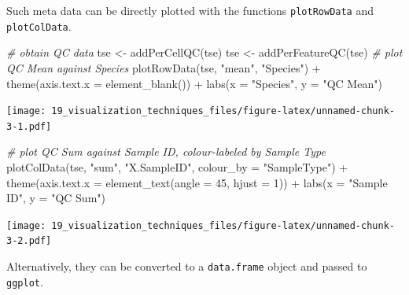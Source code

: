 \documentclass[
]{book}
\newenvironment{Shaded}{\begin{snugshade}}{\end{snugshade}}
\newcommand{\AttributeTok}[1]{\textcolor[rgb]{0.77,0.63,0.00}{#1}}
\newcommand{\CommentTok}[1]{\textcolor[rgb]{0.56,0.35,0.01}{\textit{#1}}}
\newcommand{\DecValTok}[1]{\textcolor[rgb]{0.00,0.00,0.81}{#1}}
\newcommand{\FunctionTok}[1]{\textcolor[rgb]{0.00,0.00,0.00}{#1}}
\newcommand{\NormalTok}[1]{#1}
\newcommand{\OtherTok}[1]{\textcolor[rgb]{0.56,0.35,0.01}{#1}}
\newcommand{\SpecialCharTok}[1]{\textcolor[rgb]{0.00,0.00,0.00}{#1}}
\newcommand{\StringTok}[1]{\textcolor[rgb]{0.31,0.60,0.02}{#1}}
\begin{document}
Such meta data can be directly plotted with the functions
\texttt{plotRowData} and \texttt{plotColData}.

\begin{Shaded}
\begin{Highlighting}[]
\CommentTok{\# obtain QC data}
\NormalTok{tse }\OtherTok{\textless{}{-}} \FunctionTok{addPerCellQC}\NormalTok{(tse)}
\NormalTok{tse }\OtherTok{\textless{}{-}} \FunctionTok{addPerFeatureQC}\NormalTok{(tse)}
\CommentTok{\# plot QC Mean against Species}
\FunctionTok{plotRowData}\NormalTok{(tse, }\StringTok{"mean"}\NormalTok{, }\StringTok{"Species"}\NormalTok{) }\SpecialCharTok{+}
  \FunctionTok{theme}\NormalTok{(}\AttributeTok{axis.text.x =} \FunctionTok{element\_blank}\NormalTok{()) }\SpecialCharTok{+}
  \FunctionTok{labs}\NormalTok{(}\AttributeTok{x =} \StringTok{"Species"}\NormalTok{, }\AttributeTok{y =} \StringTok{"QC Mean"}\NormalTok{)}
\end{Highlighting}
\end{Shaded}

\texttt{[image: 19\_visualization\_techniques\_files/figure-latex/unnamed-chunk-3-1.pdf]}

\begin{Shaded}
\begin{Highlighting}[]
\CommentTok{\# plot QC Sum against Sample ID, colour{-}labeled by Sample Type}
\FunctionTok{plotColData}\NormalTok{(tse, }\StringTok{"sum"}\NormalTok{, }\StringTok{"X.SampleID"}\NormalTok{, }\AttributeTok{colour\_by =} \StringTok{"SampleType"}\NormalTok{) }\SpecialCharTok{+}
  \FunctionTok{theme}\NormalTok{(}\AttributeTok{axis.text.x =} \FunctionTok{element\_text}\NormalTok{(}\AttributeTok{angle =} \DecValTok{45}\NormalTok{, }\AttributeTok{hjust =} \DecValTok{1}\NormalTok{)) }\SpecialCharTok{+}
  \FunctionTok{labs}\NormalTok{(}\AttributeTok{x =} \StringTok{"Sample ID"}\NormalTok{, }\AttributeTok{y =} \StringTok{"QC Sum"}\NormalTok{)}
\end{Highlighting}
\end{Shaded}

\texttt{[image: 19\_visualization\_techniques\_files/figure-latex/unnamed-chunk-3-2.pdf]}

Alternatively, they can be converted to a \texttt{data.frame} object and
passed to \texttt{ggplot}.
\end{document}
